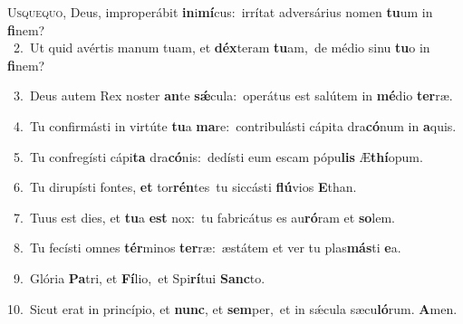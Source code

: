 \lettrine{\initial\textcolor{\initialcolor}{U}}{squequo,} Deus, improperábit \textbf{in}\-i\-\textbf{mí}\-cus:~\star irrítat adversárius nomen \textbf{tu}\-um in \textbf{fi}\-nem?\\
{\numbfont\textcolor{\numbcolor}{~2.}}~Ut quid avértis manum tuam, et \textbf{déx}\-teram \textbf{tu}\-am,~\star de médio sinu \textbf{tu}\-o in \textbf{fi}\-nem?\par
{\numbfont\textcolor{\numbcolor}{~3.}}~Deus autem Rex noster \textbf{an}\-te \textbf{sǽ}\-cula:~\star operátus est salútem in \textbf{mé}\-dio \textbf{ter}\-ræ.\par
{\numbfont\textcolor{\numbcolor}{~4.}}~Tu confirmásti in virtúte \textbf{tu}\-a \textbf{ma}\-re:~\star contribulásti cápita dra\-\textbf{có}\-num in \textbf{a}\-quis.\par
{\numbfont\textcolor{\numbcolor}{~5.}}~Tu confregísti cápi\textbf{ta} dra\-\textbf{có}\-nis:~\star dedísti eum escam pópu\textbf{lis} Æ\-\textbf{thí}\-opum.\par
{\numbfont\textcolor{\numbcolor}{~6.}}~Tu dirupísti fontes, \textbf{et} tor\-\textbf{rén}\-tes~\star tu siccásti \textbf{flú}\-vios \textbf{E}\-than.\par
{\numbfont\textcolor{\numbcolor}{~7.}}~Tuus est dies, et \textbf{tu}\-a \textbf{est} nox:~\star tu fabricátus es au\-\textbf{ró}\-ram et \textbf{so}\-lem.\par
{\numbfont\textcolor{\numbcolor}{~8.}}~Tu fecísti omnes \textbf{tér}\-minos \textbf{ter}\-ræ:~\star æstátem et ver tu plas\-\textbf{más}\-ti \textbf{e}\-a.\par
{\numbfont\textcolor{\numbcolor}{~9.}}~Glória \textbf{Pa}\-tri, et \textbf{Fí}\-lio,~\star et Spi\-\textbf{rí}\-tui \textbf{Sanc}\-to.\par
{\numbfont\textcolor{\numbcolor}{10.}}~Sicut erat in princípio, et \textbf{nunc}\-, et \textbf{sem}\-per,~\star et in sǽcula sæcu\-\textbf{ló}\-rum. \textbf{A}\-men.\par
